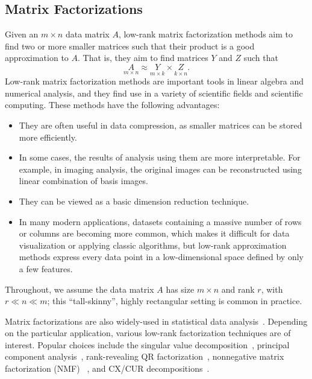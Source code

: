 
\subsection{Matrix Factorizations}

Given an $m \times n$ data matrix $A$, low-rank matrix factorization methods aim to find two or more smaller matrices such that their product is a good approximation to $A$.
That is, they aim to find matrices $Y$ and $Z$ such that
\begin{equation*}
 \label{eqn:apprx}
    \underset{m\times n}{A} \approx \underset{m\times k}{Y} \times \underset{k\times n}{Z}. 
\end{equation*}
Low-rank matrix factorization methods are important tools in linear algebra and numerical analysis, and they find use in a variety of scientific fields and scientific computing. These methods have the following advantages:
\begin{itemize}
  \item They are often useful in data compression, as smaller matrices can be stored more efficiently.
  \item In some cases, the results of analysis using them are more interpretable. For example, in imaging analysis, the original images can be reconstructed using linear combination of basis images.
  \item They can be viewed as a basic dimension reduction technique.
  \item In many modern applications, datasets containing a massive number of rows or columns are becoming more common, which makes it difficult for data visualization or applying classic algorithms, but low-rank approximation methods express every data point in a low-dimensional space defined by only a few features.
\end{itemize}
Throughout, we assume the data matrix $A$ has size $m \times n$ and rank $r$, with $r \ll n \ll m$; this ``tall-skinny'', highly rectangular setting is common in practice. 


Matrix factorizations are also widely-used in statistical data analysis~\cite{HMH00}.
Depending on the particular application, various low-rank factorization techniques are of interest. Popular choices include the singular value decomposition~\cite{GVL96}, principal component analysis~\cite{pcaBook}, rank-revealing QR factorization~\cite{GE96}, nonnegative matrix factorization (NMF) ~\cite{NMFalg}, and CX/CUR decompositions~\cite{CUR_PNAS}.

